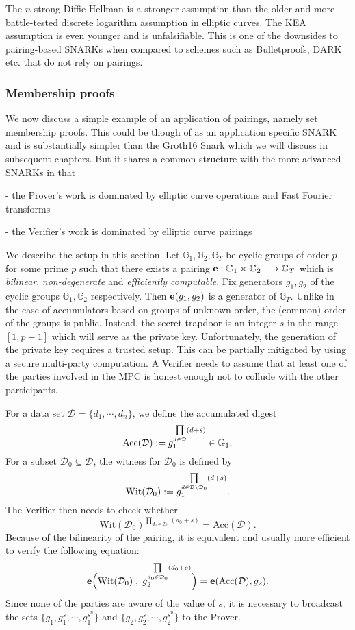 \documentclass[11pt, lettersize, notitlepage, leqno, footskip=0.6cm]{article}
\newcommand{\lra}{\longrightarrow}
\newcommand{\mc}{\mathcal}
\newcommand{\mb}{\mathbb}
\newcommand{\mr}{\mathrm}
\newcommand{\sub}{\subseteq}
\newcommand{\vs}{\vspace{-2mm}}
\newcommand{\noin}{\noindent}
\numberwithin{equation}{section}
\begin{document}
The $n$-strong Diffie Hellman is a stronger assumption than the older and more battle-tested discrete logarithm assumption in elliptic curves. The KEA assumption is even younger and is unfalsifiable. This is one of the downsides to pairing-based SNARKs when compared to schemes such as Bulletproofs, DARK etc. that do not rely on pairings.

\subsubsection{\fontsize{11}{11}\selectfont Membership proofs}


We now discuss a simple example of an application of pairings, namely set membership proofs. This could be though of as an application specific SNARK and is substantially simpler than the Groth16 Snark which we will discuss in subsequent chapters. But it shares a common structure with the more advanced SNARKs in that 

\noin - the Prover's work is dominated by elliptic curve operations and Fast Fourier transforms

\noin - the Verifier's work is dominated by elliptic curve pairings

We describe the setup in this section. Let $\mb{G}_1, \mb{G}_2, \mb{G}_T$ be cyclic groups of order $p$ for some prime $p$ such that there exists a pairing ${\bf{e}}:\mb{G}_1\times \mb{G}_2\lra \mb{G}_T$ which is \textit{bilinear}, \textit{non-degenerate} and \textit{efficiently computable}. Fix generators $g_1, g_2$ of the cyclic groups $\mb{G}_1, \mb{G}_2$ respectively. Then ${\bf{e}}(g_1,g_2)$ is a generator of $\mb{G}_T$. Unlike in the case of accumulators based on groups of unknown order, the (common) order of the groups is public. Instead, the secret trapdoor is an integer $s$ in the range $[1, p-1]$ which will serve as the private key. Unfortunately, the generation of the private key requires a trusted setup. This can be partially mitigated by using a secure multi-party computation. A Verifier needs to assume that at least one of the parties involved in the MPC is honest enough not to collude with the other participants. 

For a data set $\mc{D} = \{d_1,\cdots, d_n\}$, we define the accumulated digest \vs $$\mr{Acc}(\mc{D}):= g_1^{\prod\limits_{d\in \mc{D}} (d+s)} \in \mb{G}_1. \vs $$ For a subset $\mc{D}_0\sub \mc{D}$, the witness for $\mc{D}_0$ is defined by \vs $$\mr{Wit}(\mc{D}_0) := g_1^{\prod\limits_{d\in \mc{D}\setminus \mc{D}_0} (d+s)}. \vs $$ The Verifier then needs to check whether \vs $$\mr{Wit}(\mc{D}_0)^{\prod\limits_{d_0\in \mc{D}_0} (d_0+s)} = \mr{Acc}(\mc{D}).$$ Because of the bilinearity of the pairing, it is equivalent and usually more efficient to verify the following equation: \vs $${\bf{e}}\Big(\mr{Wit}(\mc{D}_0)\;,\; g_2^{\prod\limits_{d_0\in \mc{D}_0} (d_0+s)}\Big) = {\bf{e}}(\mr{Acc}(\mc{D}), g_2). \vs $$ Since none of the parties are aware of the value of $s$, it is necessary to broadcast the sets $\{g_1, g_1^s,\cdots , g_1^{s^n}\}$ and $\{g_2, g_2^s,\cdots , g_2^{s^n}\}$ to the Prover.
\end{document}
